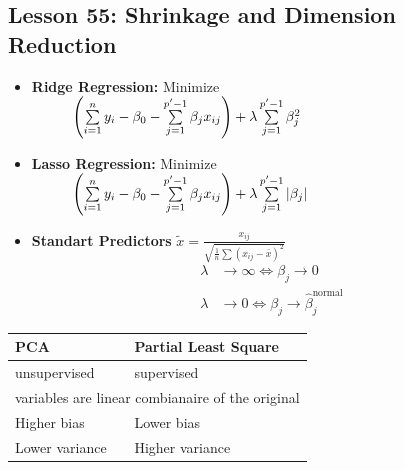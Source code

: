 \documentclass[10pt, french]{article}
\begin{document}
\begin{multicols*}{3}
\section*{Lesson 55: Shrinkage and Dimension Reduction}
\begin{itemize}[align=left,leftmargin=*]
   \item  \textbf{Ridge Regression:} Minimize \\
   $\hspace{1cm} \left(\sum\limits_{i=1}^n y_i - \beta_0 - \sum\limits_{j=1}^{p'-1} \beta_j x_{ij}\right) + \lambda \sum\limits_{j=1}^{p'-1} \beta_j^2$
   \item \textbf{Lasso Regression:} Minimize \\
   $\hspace{1cm} \left(\sum\limits_{i=1}^n y_i - \beta_0 - \sum\limits_{j=1}^{p'-1} \beta_j x_{ij}\right) + \lambda \sum\limits_{j=1}^{p'-1} |\beta_j|$
   \item \textbf{Standart Predictors} $\tilde{x} = \frac{x_{ij}}{\sqrt{\frac{1}{n}\sum (x_{ij}-\bar{x})^2}}$
   \begin{align*}
      \lambda &\to \infty \Leftrightarrow \beta_j \to 0 \\
      \lambda &\to 0 \Leftrightarrow \beta_j \to \hat{\beta}_j^{\mathrm{normal}}
   \end{align*}
\end{itemize}
\begin{tabular}{l|l}
    \hline
   PCA & Partial Least Square \\
   \hline
   unsupervised & supervised \\
   \multicolumn{2}{c}{variables are linear combianaire of the original} \\
   Higher bias & Lower bias \\
   Lower variance & Higher variance  \\
   \hline 
\end{tabular}


\end{multicols*}
\end{document}
